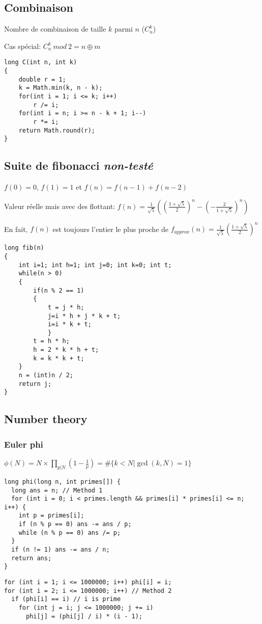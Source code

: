 \subsection{Combinaison}
Nombre de combinaison de taille $k$ parmi $n$ ($C^k_n$)

Cas spécial: $C^k_n\ mod\ 2 = n\oplus m$
\begin{lstlisting}
long C(int n, int k)
{
	double r = 1;
	k = Math.min(k, n - k);
	for(int i = 1; i <= k; i++)
		r /= i;
	for(int i = n; i >= n - k + 1; i--)
		r *= i;
	return Math.round(r);
}
\end{lstlisting}
\subsection{Suite de fibonacci {\footnotesize \textit{non-testé}}}
$f(0) = 0$, $f(1) = 1$ et $f(n) = f(n - 1) + f(n - 2)$

Valeur réelle mais avec des flottant: $f(n)=\frac{1}{\sqrt{5}}((\frac{1+\sqrt{5}}{2})^n-(-\frac{2}{1+\sqrt{5}})^n)$

En fait, $f(n)$ est toujours l'entier le plus proche de $f_{approx}(n)=\frac{1}{\sqrt{5}}(\frac{1+\sqrt{5}}{2})^n$
\begin{lstlisting}
long fib(n)
{
	int i=1; int h=1; int j=0; int k=0; int t;
	while(n > 0)
	{
		if(n % 2 == 1)
		{
			t = j * h;
			j=i * h + j * k + t; 
			i=i * k + t;
    		}
   		t = h * h;
   		h = 2 * k * h + t;
   		k = k * k + t;
	}
	n = (int)n / 2; 
	return j;
}
\end{lstlisting}

\subsection{Number theory}
\subsubsection{Euler phi}
$\phi(N) = N \times \prod_{p | N} (1 - \frac{1}{p}) = \#\{k < N | \gcd(k,N) = 1\}$
\begin{lstlisting}
long phi(long n, int primes[]) {
  long ans = n; // Method 1
  for (int i = 0; i < primes.length && primes[i] * primes[i] <= n; i++) {
    int p = primes[i];
    if (n % p == 0) ans -= ans / p;
    while (n % p == 0) ans /= p;
  }
  if (n != 1) ans -= ans / n;
  return ans;
}
\end{lstlisting}
\begin{lstlisting}
for (int i = 1; i <= 1000000; i++) phi[i] = i;
for (int i = 2; i <= 1000000; i++) // Method 2
  if (phi[i] == i) // i is prime
    for (int j = i; j <= 1000000; j += i)
      phi[j] = (phi[j] / i) * (i - 1);
\end{lstlisting}

